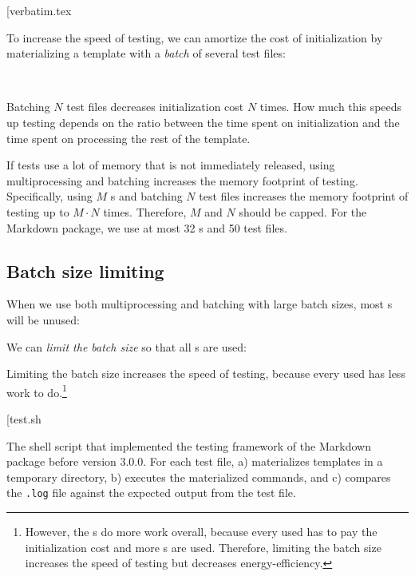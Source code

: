 \documentclass[final]{ltugboat}
\makeatletter
\newenvironment{listing*}{\@dblfloat{listing}}{\end@dblfloat}
\newcounter{listing}
\makeatother
\begin{document}
\smallskip
\noindent
\example*[{verbatim.tex}

\smallskip

To increase the speed of testing, we can amortize the cost of initialization by materializing a template with a \emph{batch} of several test files:

\medskip
\noindent
{} \\

\smallskip
\noindent
Batching $N$ test files decreases initialization cost $N$ times. How much this speeds up testing depends on the ratio between the time spent on initialization and the time spent on processing the rest of the template.

If tests use a lot of memory that is not immediately released, using multiprocessing and batching increases the memory footprint of testing. Specifically, using $M$ s and batching $N$ test files increases the memory footprint of testing up to $M\cdot N$ times. Therefore, $M$ and $N$ should be capped. For the Markdown package, we use at most 32 s and 50 test files.

\subsection{Batch size limiting}

When we use both multiprocessing and batching with large batch sizes, most s will be unused:

\smallskip
\noindent
\begingroup
\centering

\par
\endgroup

\smallskip
\noindent
We can \emph{limit the batch size} so that all s are used:

\smallskip
\noindent
\begingroup
\centering

\par
\endgroup

\smallskip
\noindent
{}
Limiting the batch size increases the speed of testing, because every used  has less work to do.\footnote{However, the s do more work overall, because every used  has to pay the initialization cost and more s are used. Therefore, limiting the batch size increases the speed of testing but decreases energy-efficiency.}

\begin{listing*}
\bigExample*[{test.sh}
\caption{The shell script  that implemented the testing framework of the Markdown package before version 3.0.0. For each test file,  a) materializes templates in a temporary directory, b) executes the materialized commands, and \linebreak c) compares the \texttt{.log} file against the expected output from the test file.}
\label{lst:test.sh}
\end{listing*}
\end{document}
